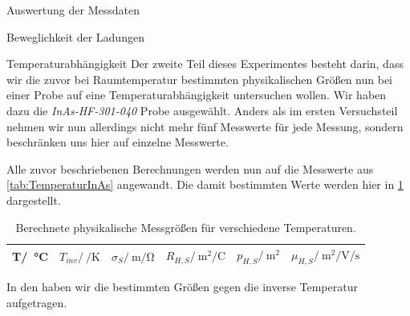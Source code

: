 \documentclass[pdftex, a4paper,11pt, twoside, ngerman]{report}
\begin{document}
\begin{chapter}{Auswertung der Messdaten}
\begin{section}{Beweglichkeit der Ladungen}
      
    \end{section}
   
   
   
    \begin{section}{Temperaturabhängigkeit}
      \label{chp:AuswertungTemperaturen}
      Der zweite Teil dieses Experimentes besteht darin, dass wir die zuvor
      bei Raumtemperatur bestimmten physikalischen Größen nun bei einer Probe
      auf eine Temperaturabhängigkeit untersuchen wollen.
      Wir haben dazu die \textit{InAs-HF-301-040} Probe ausgewählt.
      Anders als im ersten Versuchsteil nehmen wir nun allerdings nicht mehr
      fünf Messwerte für jede Messung, sondern beschränken uns hier auf einzelne
      Messwerte.
      
      Alle zuvor beschriebenen Berechnungen werden nun auf die Messwerte aus
      \cref{tab:TemperaturInAs} angewandt.
      Die damit bestimmten Werte werden hier in
      \cref{tab:TemperaturInAsResultate} dargestellt.
      
      \begin{table}[htbp]
        \centering
        \footnotesize
        \begin{tabular}{c|c|c|c|c|c}
          T/\SI{}{\celsius} & $T_{inv}/\SI{}{\per\kelvin}$ &
          $\sigma_{S}/\SI{}{\meter\per\ohm}$ &
          $R_{H,S}/\SI{}{\meter\squared\per\coulomb}$ &
          $p_{H,S}/\SI{}{\meter\squared}$ &
          $\mu_{H,S}/\SI{}{\meter\squared\per\volt\per\second}$ \\ \hline
          
        \end{tabular}
        \caption{Berechnete physikalische Messgrößen für verschiedene
            Temperaturen.}
        \label{tab:TemperaturInAsResultate}
      \end{table}
      
      In den  haben
      wir die bestimmten Größen gegen die inverse Temperatur aufgetragen.
      

\end{section}
\end{chapter}
\end{document}
